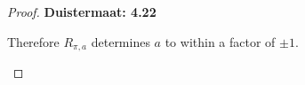\documentclass[11pt]{article}
\theoremstyle{definition}
\begin{document}
\begin{proof}{\textbf{Duistermaat: 4.22}}
\begin{itemize}
    Therefore $R_{\pi,a}$ determines $a$ to within a factor of $\pm 1$.
\end{itemize}
\end{proof}
\end{document}
